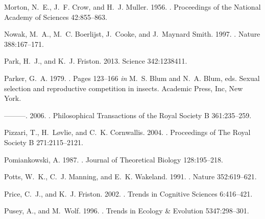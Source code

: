 \documentclass[12pt]{article}
\begin{document}
\begin{thebibliography}{73}
Morton, N.~E., J.~F. Crow, and H.~J. Muller. 1956.
.
\newblock Proceedings of the National Academy of Sciences 42:855--863.

Nowak, M.~A., M.~C. Boerlijst, J.~Cooke, and J.~{Maynard Smith}. 1997.
.
\newblock Nature 388:167--171.

Park, H.~J., and K.~J. Friston. 2013.
\newblock Science 342:1238411.

Parker, G.~A. 1979.
.
\newblock Pages 123--166 \emph{in} M.~S. Blum and N.~A. Blum, eds. Sexual
  selection and reproductive competition in insects. Academic Press, Inc, New
  York.

---{}---{}---. 2006.
.
\newblock Philosophical Transactions of the Royal Society B 361:235--259.

Pizzari, T., H.~L{\o}vlie, and C.~K. Cornwallis. 2004.
.
\newblock Proceedings of The Royal Society B 271:2115--2121.

Pomiankowski, A. 1987.
.
\newblock Journal of Theoretical Biology 128:195--218.

Potts, W.~K., C.~J. Manning, and E.~K. Wakeland. 1991.
.
\newblock Nature 352:619--621.

Price, C.~J., and K.~J. Friston. 2002.
.
\newblock Trends in Cognitive Sciences 6:416--421.

Pusey, A., and M.~Wolf. 1996.
.
\newblock Trends in Ecology {\&} Evolution 5347:298--301.


\end{thebibliography}
\end{document}
